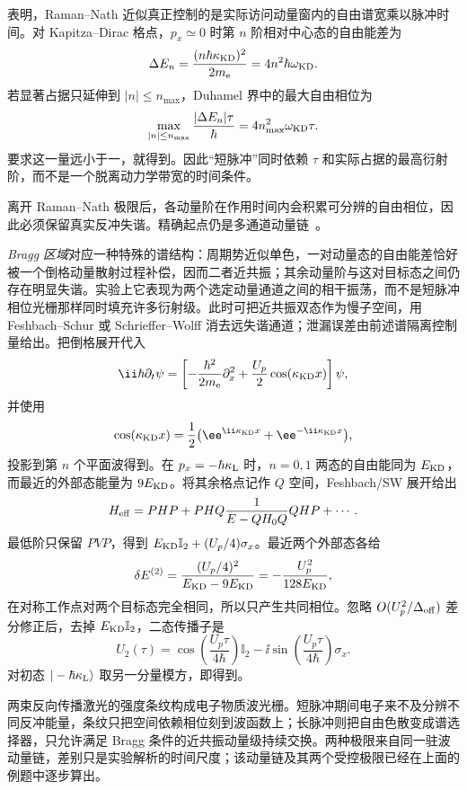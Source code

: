 \begin{exbox}
\medskip

 表明，Raman--Nath 近似真正控制的是实际访问动量窗内的自由谱宽乘以脉冲时间。对 Kapitza--Dirac 格点，$p_x\simeq0$ 时第 $n$ 阶相对中心态的自由能差为
\[
\Delta E_n
=\frac{(n\hbar\kappa_{\rm KD})^2}{2m_{\mathrm e}}
=4n^2\hbar\omega_{\rm KD}.
\]
若显著占据只延伸到 $|n|\le n_{\max}$，Duhamel 界中的最大自由相位为
\[
\max_{|n|\le n_{\max}}\frac{|\Delta E_n|\tau}{\hbar}
=4n_{\max}^2\omega_{\rm KD}\tau.
\]
要求这一量远小于一，就得到。因此“短脉冲”同时依赖 $\tau$ 和实际占据的最高衍射阶，而不是一个脱离动力学带宽的时间条件。

\medskip

离开 Raman--Nath 极限后，各动量阶在作用时间内会积累可分辨的自由相位，因此必须保留真实反冲失谐。精确起点仍是多通道动量链~。

\emph{Bragg 区域}对应一种特殊的谱结构：周期势近似单色，一对动量态的自由能差恰好被一个倒格动量散射过程补偿，因而二者近共振；其余动量阶与这对目标态之间仍存在明显失谐。实验上它表现为两个选定动量通道之间的相干振荡，而不是短脉冲相位光栅那样同时填充许多衍射级。此时可把近共振双态作为慢子空间，用 Feshbach--Schur 或 Schrieffer--Wolff 消去远失谐通道；泄漏误差由前述谱隔离控制量给出。把倒格展开代入
\[
\ii\hbar\partial_t\psi
=\left[-\frac{\hbar^2}{2m_{\mathrm e}}\partial_x^2+
\frac{U_p}{2}\cos(\kappa_{\rm KD}x)\right]\psi,
\]
并使用
\[
\cos(\kappa_{\rm KD}x)=\frac12\bigl(\ee^{\ii\kappa_{\rm KD}x}+\ee^{-\ii\kappa_{\rm KD}x}\bigr),
\]
投影到第 $n$ 个平面波得到。在 $p_x=-\hbar\kappa_{\rm L}$ 时，$n=0,1$ 两态的自由能同为 $E_{\rm KD}$，而最近的外部态能量为 $9E_{\rm KD}$。将其余格点记作 $Q$ 空间，Feshbach/SW 展开给出
\[
H_{\rm eff}=PHP+PHQ\frac{1}{E-QH_0Q}QHP+\cdots.
\]
最低阶只保留 $PVP$，得到 $E_{\rm KD}\mathbb I_2+(U_p/4)\sigma_x$。最近两个外部态各给
\[
\delta E^{(2)}
=\frac{(U_p/4)^2}{E_{\rm KD}-9E_{\rm KD}}
=-\frac{U_p^2}{128E_{\rm KD}},
\]
在对称工作点对两个目标态完全相同，所以只产生共同相位。忽略 $O(U_p^2/\Delta_{\rm off})$ 差分修正后，去掉 $E_{\rm KD}\mathbb I_2$，二态传播子是
\[
U_2(\tau)=
\cos\!\left(\frac{U_p\tau}{4\hbar}\right)\mathbb I_2
-\ii\sin\!\left(\frac{U_p\tau}{4\hbar}\right)\sigma_x.
\]
对初态 $|-\hbar\kappa_{\rm L}\rangle$ 取另一分量模方，即得到。
\end{exbox}

两束反向传播激光的强度条纹构成电子物质波光栅。短脉冲期间电子来不及分辨不同反冲能量，条纹只把空间依赖相位刻到波函数上；长脉冲则把自由色散变成谱选择器，只允许满足 Bragg 条件的近共振动量级持续交换。两种极限来自同一驻波动量链，差别只是实验解析的时间尺度；该动量链及其两个受控极限已经在上面的例题中逐步算出。

